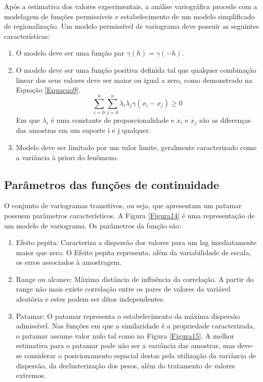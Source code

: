 Após a estimativa dos valores experimentais, a análise variográfica procede com a modelagem de funções permissíveis e estabelecimento de um modelo simplificado de regionalização. Um modelo permissível de variograma deve possuir as seguintes características: 

\begin{enumerate}
	\item 	O modelo  deve ser uma função par $\gamma(h)= \gamma(-h)$.
	\item O modelo deve ser uma função positiva definida tal que qualquer combinação linear dos seus valores deve ser maior ou igual a zero, como demonstrado na Equação \ref{Equacao9}.
	\begin{equation}\label{Equacao9}
	\sum_{i=0}^{n}\sum_{j=0}^{n}\lambda_i\lambda_j\gamma(x_i-x_j) \geq 0
	\end{equation}
	Em que $\lambda_i$ é uma constante de proporcionalidade e $x_i$ e $x_j$ são as diferenças das amostras em um suporte i e j qualquer.
	\item Modelo deve ser limitado por um valor limite, geralmente caracterizado como a variância à priori do fenômeno.
	
\end{enumerate}

\subsection{Parâmetros das funções de continuidade}

O conjunto de variogramas transitivos, ou seja, que apresentam um patamar possuem parâmetros característicos. A Figura \ref{Figura14} é uma representação de um modelo de variograma. Os parâmetros da função são:

\begin{enumerate}
	\item	Efeito pepita: Caracteriza a dispersão dos valores para um lag imediatamente maior que zero. O Efeito pepita representa, além da variabilidade de escala, os erros associados à amostragem.
	
	\item 	Range ou alcance: Máxima distância de influência da correlação. A partir do range não mais existe correlação entre os pares de valores da variável aleatória e estes podem ser ditos independentes.
	
	\item Patamar: O patamar representa o estabelecimento da máxima dispersão admissível. Nas funções em que a similaridade é a propriedade caracterizada, o patamar assume valor nulo tal como na Figura \ref{Figura15}. A melhor estimativa para o patamar pode não ser a variância das amostras, mas deve-se considerar o posicionamento espacial destas pela utilização da variância de dispersão, da declusterização dos pesos, além do tratamento de valores extremos.
	
\end{enumerate}

